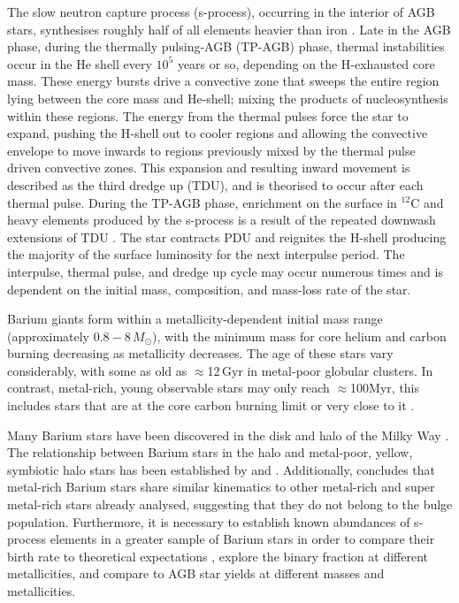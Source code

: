 \documentclass[a4paper,fleqn,usenatbib]{mnras}
\begin{document}
The slow neutron capture process (s-process), occurring in the interior of AGB stars, synthesises roughly half of all elements heavier than iron \citep[e.g.,][]{busso1999,travaglio2001,herwig2005,romano2010,kobayashi2011,prantzos2012,bisterzo2014,karakas12016}. Late in the AGB phase, during the thermally pulsing-AGB (TP-AGB) phase, thermal instabilities occur in the He shell every $10^5$ years or so, depending on the H-exhausted core mass. These energy bursts drive a convective zone that sweeps the entire region lying between the core mass and He-shell; mixing the products of nucleosynthesis within these regions. The energy from the thermal pulses force the star to expand, pushing the H-shell out to cooler regions and allowing the convective envelope to move inwards to regions previously mixed by the thermal pulse driven convective zones. This expansion and resulting inward movement is described as the third dredge up (TDU), and is theorised to occur after each thermal pulse. During the TP-AGB phase, enrichment on the surface in $^{12}$C and heavy elements produced by the s-process is a result of the repeated downwash extensions of TDU \citep[e.g.,][]{busso2001}. The star contracts PDU and reignites the H-shell producing the majority of the surface luminosity for the next interpulse period. The interpulse, thermal pulse, and dredge up cycle may occur numerous times and is dependent on the initial mass, composition, and mass-loss rate of the star.

Barium giants form within a metallicity-dependent initial mass range (approximately $0.8 - 8\,M_{\odot}$), with the minimum mass for core helium and carbon burning decreasing as metallicity decreases. The age of these stars vary considerably, with some as old as $\approx$12\,Gyr in metal-poor globular clusters. In contrast, metal-rich, young observable stars may only reach $\approx$100Myr, this includes stars that are at the core carbon burning limit or very close to it \citep[e.g.,][]{whitelock2013}.

Many Barium stars have been discovered in the disk and halo of the Milky Way \citep{gomez1997,mennessier1997}. 
The relationship between Barium stars in the halo \citep[e.g.,][]{junqueira2001,drake2008,pereira2009,allen2006} and metal-poor, yellow, symbiotic halo stars has been established by \citet{jorissen2005} and \citet{pereira2009}. Additionally, \citet{pereira2011} concludes that metal-rich Barium stars share similar kinematics to other metal-rich and super metal-rich stars already analysed, suggesting that they do not belong to the bulge population. Furthermore, it is necessary to establish known abundances of s-process elements in a greater sample of Barium stars in order to compare their birth rate to theoretical expectations \citep{han1995}, explore the binary fraction at different metallicities, and compare to AGB star yields at different masses and metallicities.
\end{document}
